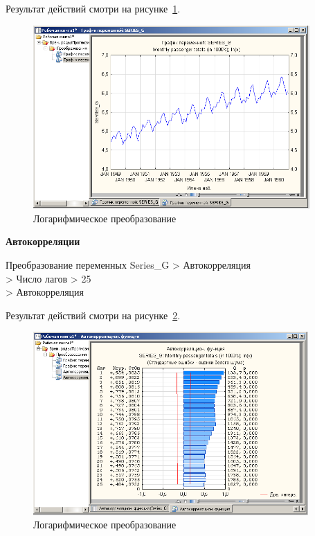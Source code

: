 Результат действий смотри на рисунке~\ref{fig:4}.

\begin{figure}[!h]
  \centering

  \includegraphics[height=7cm]
  {inc/4.PNG}

  \caption{Логарифмическое преобразование}

  \label{fig:4}
\end{figure}

\begin{center}
  \textbf{Автокорреляции}
\end{center}

Преобразование переменных Series\_G > Автокорреляция\\
> Число лагов > 25\\
> Автокорреляция

Результат действий смотри на рисунке~\ref{fig:5}.

\begin{figure}[!h]
  \centering

  \includegraphics[height=7cm]
  {inc/5.PNG}

  \caption{Логарифмическое преобразование}

  \label{fig:5}
\end{figure}

